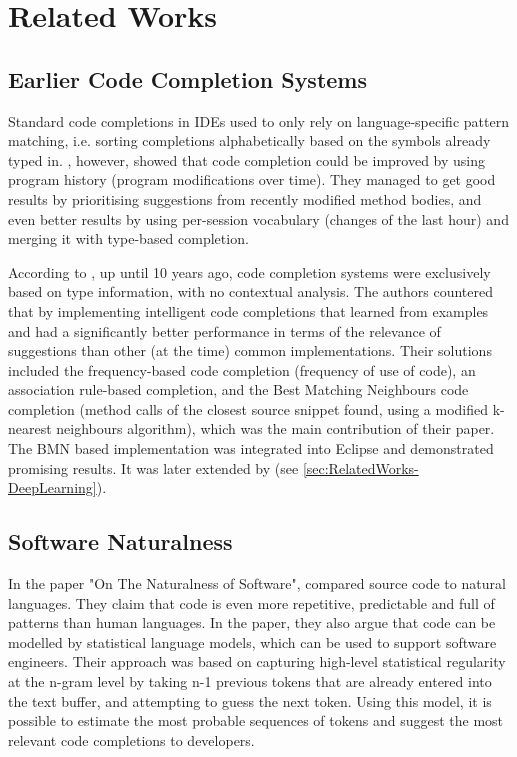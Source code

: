 \chapter{Related Works}
\label{chap:RelatedWorks}

\section{Earlier Code Completion Systems}
\label{sec:RelatedWorks-EarlierSystems}
Standard code completions in IDEs used to only rely on language-specific pattern matching, i.e. sorting completions alphabetically based on the symbols already typed in. \cite{Robb08a}, however, showed that code completion could be improved by using program history (program modifications over time). They managed to get good results by prioritising suggestions from recently modified method bodies, and even better results by using per-session vocabulary (changes of the last hour) and merging it with type-based completion.

According to \cite{Bruc09a}, up until 10 years ago, code completion systems were exclusively based on type information, with no contextual analysis. The authors countered that by implementing intelligent code completions that learned from examples and had a significantly better performance in terms of the relevance of suggestions than other (at the time) common implementations. Their solutions included the frequency-based code completion (frequency of use of code), an association rule-based completion, and the Best Matching Neighbours code completion (method calls of the closest source snippet found, using a modified k-nearest neighbours algorithm), which was the main contribution of their paper. The BMN based implementation was integrated into Eclipse and demonstrated promising results. It was later extended by \cite{Prok15a} (see \ref{sec:RelatedWorks-DeepLearning}).

\section{Software Naturalness}
\label{sec:RelatedWorks-SoftwareNaturalness}
In the paper "On The Naturalness of Software", \cite{Hind12a} compared source code to natural languages. They claim that code is even more repetitive, predictable and full of patterns than human languages. In the paper, they also argue that code can be modelled by statistical language models, which can be used to support software engineers. Their approach was based on capturing high-level statistical regularity at the n-gram level by taking n-1 previous tokens that are already entered into the text buffer, and attempting to guess the next token. Using this model, it is possible to estimate the most probable sequences of tokens and suggest the most relevant code completions to developers.

